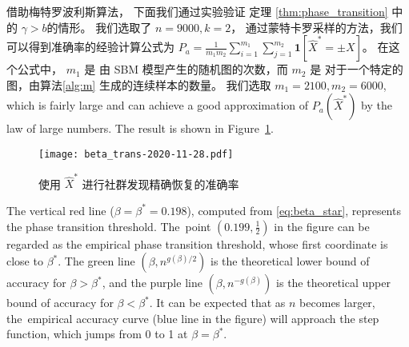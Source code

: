 借助梅特罗波利斯算法，
下面我们通过实验验证 定理 \ref{thm:phase_transition} 中的 $\gamma > b$的情形。
我们选取了 $n=9000, k=2$，
通过蒙特卡罗采样的方法，我们可以得到准确率的经验计算公式为
$P_a = \frac{1}{m_1m_2}\sum_{i=1}^{m_1} \sum_{j=1}^{m_2} \mathbf{1}[\hat{X}^* = \pm X]$。
在这个公式中，
$m_1$ 是 由 SBM 模型产生的随机图的次数，而
$m_2$ 是 对于一个特定的图，由算法\ref{alg:m} 生成的连续样本的数量。
我们选取 $m_1=2100,m_2=6000$, which is fairly large and can achieve a good approximation of $P_a(\hat{X}^*)$ by the law of large numbers.
The result is shown in Figure~\ref{fig:erh}.

\begin{figure}[ht!]
	\centering
		\texttt{[image: beta\_trans-2020-11-28.pdf]}
		\caption{使用 $\hat{X}^*$ 进行社群发现精确恢复的准确率}\label{fig:erh}
\end{figure}


The vertical red line ($\beta=\beta^* = 0.198$), computed from \eqref{eq:beta_star}, represents the phase transition threshold. The~point $(0.199,\frac{1}{2})$ in the figure
can be regarded as the empirical phase transition threshold, whose first coordinate is close to $\beta^*$.
The green line $(\beta, n^{g(\beta)/2})$ is the theoretical lower bound of accuracy for $\beta>\beta^*$, and the purple line
$(\beta, n^{-g(\beta)})$ is the theoretical upper bound of accuracy for $\beta < \beta^*$. It can be expected that
as $n$ becomes larger, the~empirical accuracy curve (blue line in the figure) will approach the step function, which jumps from
0 to 1 at $\beta=\beta^*$.
